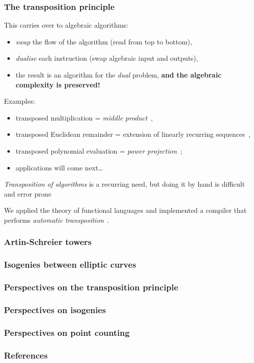 \documentclass[10pt]{beamer}
\newcommand{\0}{\mathcal{O}}  %
\begin{document}
\begin{frame}
  \frametitle{The transposition principle}

  This carries over to algebraic algorithms:
  \begin{itemize}
  \item \emph{swap} the flow of the algorithm (read from top to bottom),
  \item \emph{dualise} each instruction (swap algebraic input and outputs),
  \item the result is an algorithm for the \emph{dual} problem,
    \textbf{and the algebraic complexity is preserved!}
  \end{itemize}

  Examples:
  \begin{itemize}
  \item transposed multiplication = \emph{middle
      product}~\cite{hanrot+quercia+zimmermann},
  \item transposed Euclidean remainder = extension of linearly
    recurring sequences~\cite{bostan+lecerf+schost:tellegen},
  \item transposed polynomial evaluation = \emph{power
      projection}~\cite{shoup94,shoup95,shoup99,bostan+salvy+schost03};
  \item applications will come next\dots
  \end{itemize}

  \emph{Transposition of algorithms} is a recurring need, but doing it
  by hand is difficult and error prone

  \begin{center}
    \large We applied the theory of functional languages and
    implemented a compiler that performs \emph{automatic
      transposition}~\cite{df+schost10}.
  \end{center}
\end{frame}


\begin{frame}
  \frametitle{Artin-Schreier towers}
  
\end{frame}


\begin{frame}
  \frametitle{Isogenies between elliptic curves}
  
\end{frame}


\begin{frame}
  \frametitle{Perspectives on the transposition principle}
  
\end{frame}


\begin{frame}
  \frametitle{Perspectives on isogenies}
  
\end{frame}


\begin{frame}
  \frametitle{Perspectives on point counting}
  
\end{frame}


\begin{frame}[allowframebreaks]
  \frametitle{References}
  
  
  
\end{frame}
\end{document}

